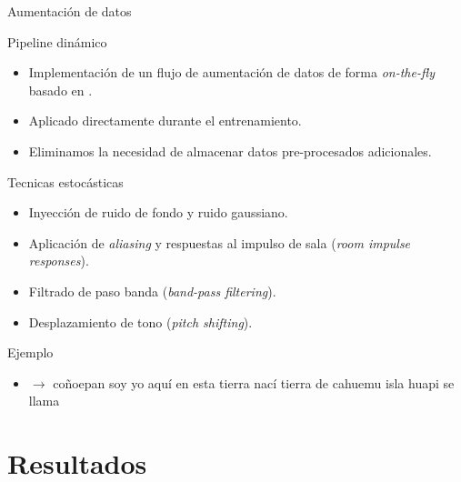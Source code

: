 \documentclass[11pt]{beamer}
\begin{document}
\begin{frame}{Aumentación de datos}

    \begin{block}{Pipeline dinámico}
        \begin{itemize}
            \item Implementación de un flujo de aumentación de datos de forma \textit{on-the-fly} basado en \cite{audiomentations}.
            \item Aplicado directamente durante el entrenamiento.
            \item Eliminamos la necesidad de almacenar datos pre-procesados adicionales.
        \end{itemize}
    \end{block}
    
    \begin{block}{Tecnicas estocásticas}
        \begin{itemize}
            \item Inyección de ruido de fondo y ruido gaussiano.
            \item Aplicación de \textit{aliasing} y respuestas al impulso de sala (\textit{room impulse responses}).
            \item Filtrado de paso banda (\textit{band-pass filtering}).
            \item Desplazamiento de tono (\textit{pitch shifting}).
        \end{itemize}
    \end{block}
\end{frame}

\begin{frame}
    \begin{exampleblock}{Ejemplo}
        \begin{itemize}
            \item {} $\rightarrow$ coñoepan soy yo aquí en esta tierra nací tierra de cahuemu isla huapi se llama
        \end{itemize}
        
    \end{exampleblock}
     
\end{frame}

\section{Resultados}
\end{document}
